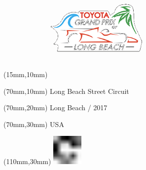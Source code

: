\null\newpage
\begin{textblock*}{50mm}(15mm,10mm)%
\includegraphics[width=50mm]{LG/LON.png}
\end{textblock*}
\begin{textblock*}{130mm}(70mm,10mm)%
{\fontsize{20}{20}\selectfont Long Beach Street Circuit}\\
\end{textblock*}
\begin{textblock*}{120mm}(70mm,20mm)%
{\fontsize{16}{16}\selectfont Long Beach / 2017}\\
\end{textblock*}
\begin{textblock*}{120mm}(70mm,30mm)%
{\fontsize{12}{12}\selectfont USA}
\end{textblock*}
\begin{textblock*}{30mm}(110mm,30mm)%
\centering
\includegraphics[height=15mm]{icons/fa-rotate-right.pdf}
\end{textblock*}
